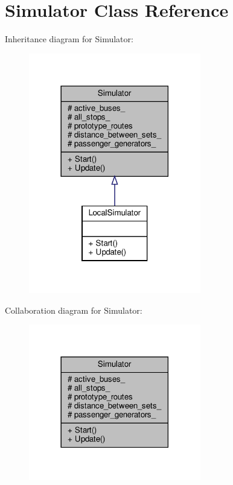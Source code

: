 \hypertarget{classSimulator}{}\section{Simulator Class Reference}
\label{classSimulator}


Inheritance diagram for Simulator\+:
\nopagebreak
\begin{figure}[H]
\begin{center}
\leavevmode
\includegraphics[width=213pt]{classSimulator__inherit__graph}
\end{center}
\end{figure}


Collaboration diagram for Simulator\+:
\nopagebreak
\begin{figure}[H]
\begin{center}
\leavevmode
\includegraphics[width=213pt]{classSimulator__coll__graph}
\end{center}
\end{figure}
